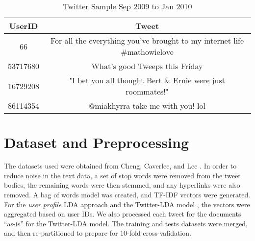 \documentclass{acm_proc_article-sp}
\begin{document}
\begin{table*}[ht]
	\caption{Twitter Sample Sep 2009 to Jan 2010}
	\centering
	\begin{tabular}{c c}   
		\hline\hline\rule{0pt}{2ex}
		UserID & Tweet \\
		\hline\rule{0pt}{3ex}
		66 & For all the everything you've brought to my internet life \#mathowielove \\
		53717680 & What's good Tweeps this Friday \\
		16729208 &"I bet you all thought Bert \& Ernie were just roommates!" \\ 
		86114354 & @miakhyrra take me with you! lol \\ [1ex] 
		\hline 
	\end{tabular}
	\label{table:sample} %
\end{table*}

\section{Dataset and Preprocessing}
\hspace*{5mm}The datasets used were obtained from Cheng, Caverlee, and Lee \cite{cheng2010content}. In order to reduce noise in the text data, a set of stop words were removed from the tweet bodies, the remaining words were then stemmed, and any hyperlinks were also removed. A bag of words model was created, and TF-IDF vectors were generated. For the \textit{user profile} LDA approach \cite{hong2010empirical} and the Twitter-LDA model \cite{zhao2011comparing}, the vectors were aggregated based on user IDs. We also processed each tweet for the documents ``as-is'' for the Twitter-LDA model. The training and tests datasets were merged, and then re-partitioned to prepare for 10-fold cross-validation.
\end{document}
